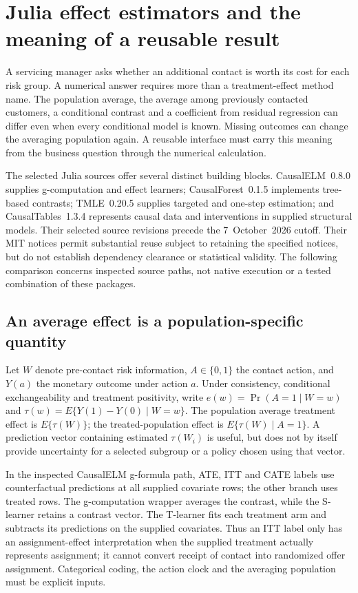 \section{Julia effect estimators and the meaning of a reusable result}
\label{exec21:effects-scope}

A servicing manager asks whether an additional contact is worth its cost for
each risk group. A numerical answer requires more than a treatment-effect
method name. The population average, the average among previously contacted
customers, a conditional contrast and a coefficient from residual regression
can differ even when every conditional model is known. Missing outcomes can
change the averaging population again. A reusable interface must carry this
meaning from the business question through the numerical calculation.

The selected Julia sources offer several distinct building blocks.
CausalELM~0.8.0 supplies g-computation and effect learners; CausalForest~0.1.5
implements tree-based contrasts; TMLE~0.20.5 supplies targeted and one-step
estimation; and CausalTables~1.3.4 represents causal data and interventions in
supplied structural models. Their selected source revisions precede the
7~October~2026 cutoff. Their MIT notices permit substantial reuse subject to
retaining the specified notices, but do not establish dependency clearance or
statistical validity. The following comparison concerns inspected source
paths, not native execution or a tested combination of these packages.
\citep{exec21_effects_causalelm,exec21_effects_causalforest,exec21_effects_tmle,exec21_effects_causaltables}

\subsection{An average effect is a population-specific quantity}
\label{exec21:effects-target}

Let $W$ denote pre-contact risk information, $A\in\{0,1\}$ the contact action,
and $Y(a)$ the monetary outcome under action $a$. Under consistency,
conditional exchangeability and treatment positivity, write
$e(w)=\Pr(A=1\mid W=w)$ and
$\tau(w)=E\{Y(1)-Y(0)\mid W=w\}$. The population average treatment effect is
$E\{\tau(W)\}$; the treated-population effect is
$E\{\tau(W)\mid A=1\}$. A prediction vector containing estimated
$\tau(W_i)$ is useful, but does not by itself provide uncertainty for a
selected subgroup or a policy chosen using that vector.

In the inspected CausalELM g-formula path, ATE, ITT and CATE labels use
counterfactual predictions at all supplied covariate rows; the other branch
uses treated rows. The g-computation wrapper averages the contrast, while the
S-learner retains a contrast vector. The T-learner fits each treatment arm and
subtracts its predictions on the supplied covariates. Thus an ITT label only
has an assignment-effect interpretation when the supplied treatment actually
represents assignment; it cannot convert receipt of contact into randomized
offer assignment. Categorical coding, the action clock and the averaging
population must be explicit inputs. \citep{exec21_effects_causalelm}

